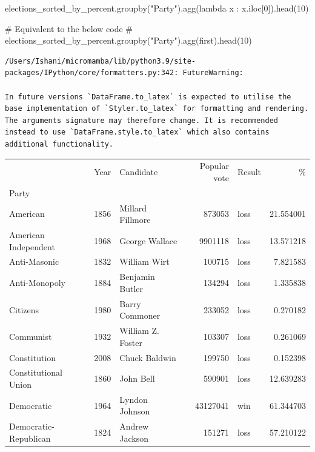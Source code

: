 \documentclass[
  letterpaper,
  DIV=11,
  numbers=noendperiod]{scrreprt}
\newenvironment{Shaded}{\begin{snugshade}}{\end{snugshade}}
\newcommand{\CommentTok}[1]{\textcolor[rgb]{0.37,0.37,0.37}{#1}}
\newcommand{\DecValTok}[1]{\textcolor[rgb]{0.68,0.00,0.00}{#1}}
\newcommand{\KeywordTok}[1]{\textcolor[rgb]{0.00,0.23,0.31}{#1}}
\newcommand{\NormalTok}[1]{\textcolor[rgb]{0.00,0.23,0.31}{#1}}
\newcommand{\StringTok}[1]{\textcolor[rgb]{0.13,0.47,0.30}{#1}}
\begin{document}
\begin{Shaded}
\begin{Highlighting}[]
\NormalTok{elections\_sorted\_by\_percent.groupby(}\StringTok{"Party"}\NormalTok{).agg(}\KeywordTok{lambda}\NormalTok{ x : x.iloc[}\DecValTok{0}\NormalTok{]).head(}\DecValTok{10}\NormalTok{)}

\CommentTok{\# Equivalent to the below code}
\CommentTok{\# elections\_sorted\_by\_percent.groupby("Party").agg(\textquotesingle{}first\textquotesingle{}).head(10)}
\end{Highlighting}
\end{Shaded}

\begin{verbatim}
/Users/Ishani/micromamba/lib/python3.9/site-packages/IPython/core/formatters.py:342: FutureWarning:

In future versions `DataFrame.to_latex` is expected to utilise the base implementation of `Styler.to_latex` for formatting and rendering. The arguments signature may therefore change. It is recommended instead to use `DataFrame.style.to_latex` which also contains additional functionality.
\end{verbatim}

\begin{tabular}{lrlrlr}
\toprule
{} &  Year &          Candidate &  Popular vote & Result &          \% \\
Party                 &       &                    &               &        &            \\
\midrule
American              &  1856 &   Millard Fillmore &        873053 &   loss &  21.554001 \\
American Independent  &  1968 &     George Wallace &       9901118 &   loss &  13.571218 \\
Anti-Masonic          &  1832 &       William Wirt &        100715 &   loss &   7.821583 \\
Anti-Monopoly         &  1884 &    Benjamin Butler &        134294 &   loss &   1.335838 \\
Citizens              &  1980 &     Barry Commoner &        233052 &   loss &   0.270182 \\
Communist             &  1932 &  William Z. Foster &        103307 &   loss &   0.261069 \\
Constitution          &  2008 &      Chuck Baldwin &        199750 &   loss &   0.152398 \\
Constitutional Union  &  1860 &          John Bell &        590901 &   loss &  12.639283 \\
Democratic            &  1964 &     Lyndon Johnson &      43127041 &    win &  61.344703 \\
Democratic-Republican &  1824 &     Andrew Jackson &        151271 &   loss &  57.210122 \\
\bottomrule
\end{tabular}
\end{document}
